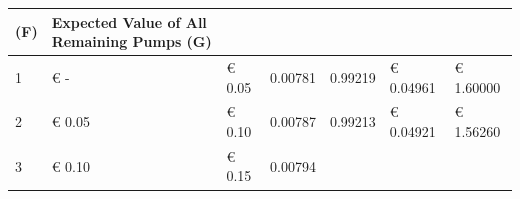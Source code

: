 \documentclass[serif, twocolumn, review]{jote-article}
\begin{document}
\begin{table}[ht]
\begin{tabular}{@{}lllllll@{}}
\begin{minipage}[b]{0.12\linewidth}
\textbf{(F)}\strut \end{minipage} & \begin{minipage}[b]{0.12\linewidth}\raggedright \textbf{Expected Value of All Remaining Pumps (G)}\strut \end{minipage}\tabularnewline \hline \begin{minipage}[t]{0.12\linewidth}\raggedright 1\strut \end{minipage} & \begin{minipage}[t]{0.12\linewidth}\raggedright € -\strut \end{minipage} & \begin{minipage}[t]{0.12\linewidth}\raggedright € 0.05\strut \end{minipage} & \begin{minipage}[t]{0.12\linewidth}\raggedright 0.00781\strut \end{minipage} & \begin{minipage}[t]{0.12\linewidth}\raggedright 0.99219\strut \end{minipage} & \begin{minipage}[t]{0.12\linewidth}\raggedright € 0.04961\strut \end{minipage} & \begin{minipage}[t]{0.12\linewidth}\raggedright € 1.60000\strut \end{minipage}\tabularnewline \begin{minipage}[t]{0.12\linewidth}\raggedright 2\strut \end{minipage} & \begin{minipage}[t]{0.12\linewidth}\raggedright € 0.05\strut \end{minipage} & \begin{minipage}[t]{0.12\linewidth}\raggedright € 0.10\strut \end{minipage} & \begin{minipage}[t]{0.12\linewidth}\raggedright 0.00787\strut \end{minipage} & \begin{minipage}[t]{0.12\linewidth}\raggedright 0.99213\strut \end{minipage} & \begin{minipage}[t]{0.12\linewidth}\raggedright € 0.04921\strut \end{minipage} & \begin{minipage}[t]{0.12\linewidth}\raggedright € 1.56260\strut \end{minipage}\tabularnewline \begin{minipage}[t]{0.12\linewidth}\raggedright 3\strut \end{minipage} & \begin{minipage}[t]{0.12\linewidth}\raggedright € 0.10\strut \end{minipage} & \begin{minipage}[t]{0.12\linewidth}\raggedright € 0.15\strut \end{minipage} & \begin{minipage}[t]{0.12\linewidth}\raggedright 0.00794\strut \end{minipage} & 
\end{minipage}
\end{tabular}
\end{table}
\end{document}
